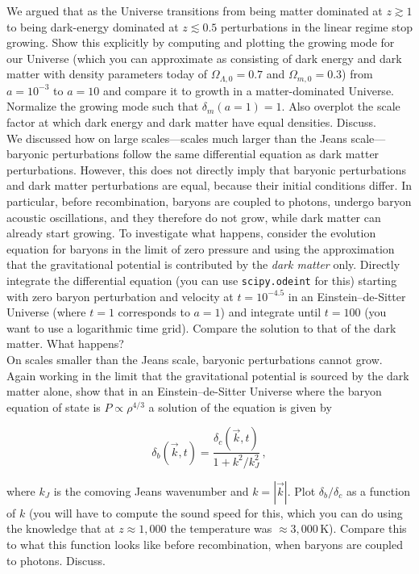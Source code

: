 \documentclass[12pt]{article}
\begin{document}
 We argued that as the Universe transitions from
being matter dominated at $z \gtrsim 1$ to being dark-energy dominated
at $z \lesssim 0.5$ perturbations in the linear regime stop
growing. Show this explicitly by computing and plotting the growing
mode for our Universe (which you can approximate as consisting of dark
energy and dark matter with density parameters today of
$\Omega_{\Lambda,0} = 0.7$ and $\Omega_{m,0} = 0.3$) from $a = 10^{-3}$
to $a=10$ and compare it to growth in a matter-dominated
Universe. Normalize the growing mode such that $\delta_m(a=1) =
1$. Also overplot the scale factor at which dark energy and dark
matter have equal densities. Discuss.\\

 We discussed how on large scales---scales much
larger than the Jeans scale---baryonic perturbations follow the same
differential equation as dark matter perturbations. However, this does
not directly imply that baryonic perturbations and dark matter
perturbations are equal, because their initial conditions differ. In
particular, before recombination, baryons are coupled to photons,
undergo baryon acoustic oscillations, and they therefore do not grow,
while dark matter can already start growing. To investigate what
happens, consider the evolution equation for baryons in the limit of
zero pressure and using the approximation that the gravitational
potential is contributed by the \emph{dark matter} only. Directly
integrate the differential equation (you can use \texttt{scipy.odeint}
for this) starting with zero baryon perturbation and velocity at
$t=10^{-4.5}$ in an Einstein--de-Sitter Universe (where $t=1$
corresponds to $a=1$) and integrate until $t=100$ (you want to use a
logarithmic time grid). Compare the solution to that of the dark
matter. What happens?\\

 On scales smaller than the Jeans scale, baryonic
perturbations cannot grow. Again working in the limit that the
gravitational potential is sourced by the dark matter alone, show that
in an Einstein--de-Sitter Universe where the baryon equation of state
is $P \propto \rho^{4/3}$ a solution of the equation is given by

\begin{equation}
  \delta_b(\vec{k},t) = \frac{\delta_c(\vec{k},t)}{1+k^2/k_J^2}\,,
\end{equation}

where $k_J$ is the comoving Jeans wavenumber and $k = |\vec{k}|$. Plot
$\delta_b/\delta_c$ as a function of $k$ (you will have to compute the
sound speed for this, which you can do using the knowledge that at
$z\approx 1,000$ the temperature was $\approx
3,000\,\mathrm{K}$). Compare this to what this function looks like
before recombination, when baryons are coupled to photons. Discuss.\\
\end{document}
